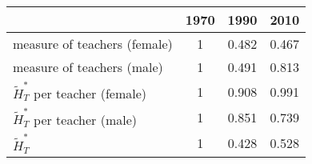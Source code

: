 \begin{table}
  \centering \begin{tabular}{lccc}
\toprule
& 1970 & 1990 & 2010 \\
\midrule
measure of teachers (female) & 1 & 0.482 &0.467\\
measure of teachers (male) & 1 & 0.491 & 0.813\\
$\widetilde{H}_T^*$ per teacher (female)   & 1 & 0.908 & 0.991 \\
$\widetilde{H}_T^*$ per teacher (male)   & 1 & 0.851 & 0.739 \\
$\widetilde{H}_T^*$ & 1  & 0.428 & 0.528 \\
\bottomrule
\end{tabular}
  \label{ }
\end{table}
